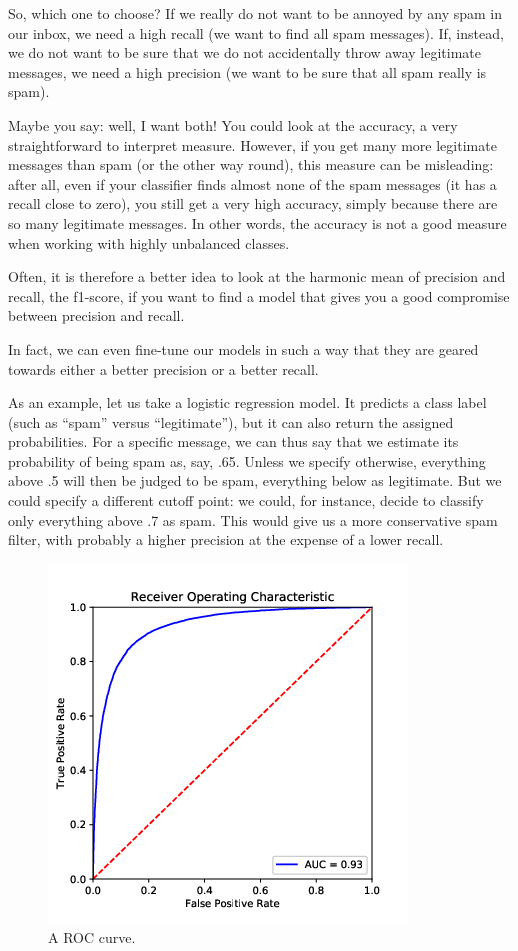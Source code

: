So, which one to choose?  If we really do not want to be annoyed by
any spam in our inbox, we need a high recall (we want to find all spam
messages). If, instead, we do not want to be sure that we do not
accidentally throw away legitimate messages, we need a high
precision (we want to be sure that all spam really is spam).

Maybe you say: well, I want both!  You could look at the accuracy, a
very straightforward to interpret measure. However, if you get many
more legitimate messages than spam (or the other way round), this
measure can be misleading: after all, even if your classifier finds
almost none of the spam messages (it has a recall close to zero), you
still get a very high accuracy, simply because there are so many
legitimate messages. In other words, the accuracy is not a good measure when working with highly unbalanced classes.

Often, it is therefore a better idea to look at the harmonic mean of
precision and recall, the f1-score, if you want to find a model that
gives you a good compromise between precision and recall.


In fact, we can even fine-tune our models in such a way that they are
geared towards either a better precision or a better recall.

As an example, let us take a logistic regression model. It predicts a
class label (such as ``spam'' versus ``legitimate''), but it can also
return the assigned probabilities. For a specific message, we can thus
say that we estimate its probability of being spam as, say, .65.
Unless we specify otherwise, everything above .5 will then be judged
to be spam, everything below as legitimate. But we could specify a
different cutoff point: we could, for instance, decide to classify
only everything above .7 as spam. This would give us a more
conservative spam filter, with probably a higher precision at the
expense of a lower recall.

\begin{figure} 
\centering
\includegraphics[width=0.4\linewidth]{figures/ch09_roccurve}
\caption{A ROC curve.}
\label{fig:roccurve}
\end{figure}

